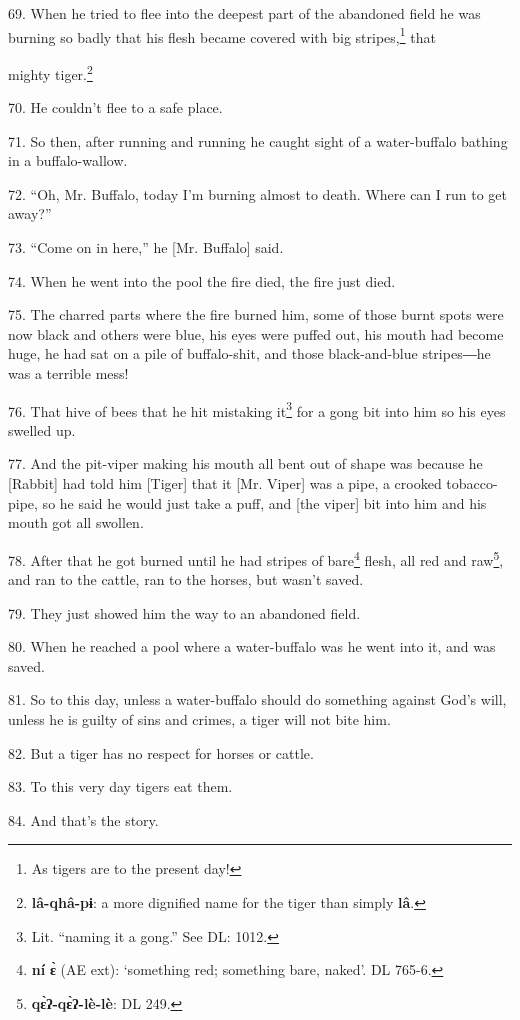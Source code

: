 69. When he tried to flee into the deepest part of the abandoned field he was burning
so badly that his flesh became covered with big stripes,\footnote{As tigers are to the present day!} that

mighty tiger.\footnote{\textbf{lâ-qhâ-pɨ}: a more dignified name for the tiger than simply \textbf{lâ}.}

70. He couldn't flee to a safe place.

71. So then, after running and running he caught sight of a water-buffalo bathing
in a buffalo-wallow.

72. ``Oh, Mr. Buffalo, today I'm burning almost to death. Where can I run to get
away?''

73. ``Come on in here,'' he [Mr. Buffalo] said.

74. When he went into the pool the fire died, the fire just died.

75. The charred parts where the fire burned him, some of those burnt spots were
now black and others were blue, his eyes were puffed out, his mouth had become huge, he had sat on a pile of buffalo-shit, and those black-and-blue
stripes―he was a terrible mess!

76. That hive of bees that he hit mistaking it\footnote{Lit. ``naming it a gong.'' See DL: 1012.} for a gong bit into him so his
eyes swelled up.

77. And the pit-viper making his mouth all bent out of shape was because he [Rabbit]
had told him [Tiger] that it [Mr. Viper] was a pipe, a crooked tobacco-pipe, so he said he would just take a puff, and [the viper] bit into him
and his mouth got all swollen.

78. After that he got burned until he had stripes of bare\footnote{\textbf{ní} \textbf{ɛ̀} (AE ext): `something red; something bare, naked'. DL 765-6.} flesh, all red and
raw\footnote{\textbf{qɛ̀ʔ-qɛ̀ʔ-lè-lè}: DL 249.}, and ran to the cattle, ran to the horses, but wasn't saved.

79. They just showed him the way to an abandoned field.

80. When he reached a pool where a water-buffalo was he went into it, and was saved.

81. So to this day, unless a water-buffalo should do something against God's will,
unless he is guilty of sins and crimes, a tiger will not bite him.

82. But a tiger has no respect for horses or cattle.

83. To this very day tigers eat them.

84. And that's the story.

